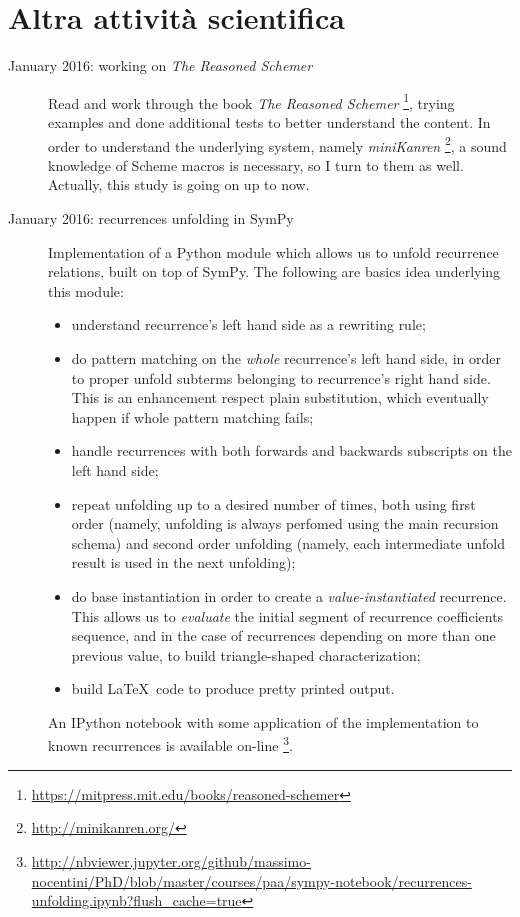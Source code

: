 \documentclass[11pt]{article}
\begin{document}
\section*{Altra attivit\`a scientifica}

\begin{description}

\item[January 2016: working on \emph{The Reasoned Schemer}]
    Read and work through the book \emph{The Reasoned Schemer}
    \footnote{\url{https://mitpress.mit.edu/books/reasoned-schemer}}, trying examples
    and done additional tests to better understand the content.
    In order to understand the underlying system, namely \emph{miniKanren}
    \footnote{\url{http://minikanren.org/}}, a sound knowledge of Scheme macros
    is necessary, so I turn to them as well. Actually, this study is
    going on up to now.

\item[January 2016: recurrences unfolding in SymPy] 
    Implementation of a Python module which allows us to unfold
    recurrence relations, built on top of SymPy. The following are basics idea underlying
    this module:
    \begin{itemize}
        \item understand recurrence's left hand side as a rewriting rule;
        \item do pattern matching on the \emph{whole} recurrence's left hand side,
            in order to proper unfold subterms belonging to recurrence's right hand
            side. This is an enhancement respect plain substitution, which eventually
            happen if whole pattern matching fails; 
        \item handle recurrences with both forwards and backwards subscripts on the
            left hand side;
        \item repeat unfolding up to a desired number of times, both using first order
            (namely, unfolding is always perfomed using the main recursion schema)
            and second order unfolding (namely, each intermediate unfold result is used
            in the next unfolding);
        \item do base instantiation in order to create a \emph{value-instantiated}
            recurrence. This allows us to \emph{evaluate} the initial segment of
            recurrence coefficients sequence, and in the case of recurrences
            depending on more than one previous value, to build triangle-shaped characterization;
        \item build \LaTeX\, code to produce pretty printed output.
    \end{itemize}
    An IPython notebook with some application of the implementation to known recurrences is available on-line 
    \footnote{\url{http://nbviewer.jupyter.org/github/massimo-nocentini/PhD/blob/master/courses/paa/sympy-notebook/recurrences-unfolding.ipynb?flush_cache=true}}.

\end{description}
\end{document}

